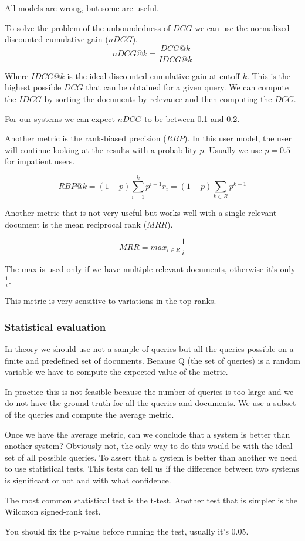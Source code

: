 All models are wrong, but some are useful.

To solve the problem of the unboundedness of $DCG$ we can use the normalized discounted
cumulative gain ($nDCG$).
\[
    nDCG@k = \frac{DCG@k}{IDCG@k}
\]

Where $IDCG@k$ is the ideal discounted cumulative gain at cutoff $k$. This is the
highest possible $DCG$ that can be obtained for a given query.
We can compute the $IDCG$ by sorting the documents by relevance and then computing the $DCG$.

For our systems we can expect $nDCG$ to be between 0.1 and 0.2.

Another metric is the rank-biased precision ($RBP$).
In this user model, the user will continue looking at the results with a probability $p$.
Usually we use $p=0.5$ for impatient users.

\[
    RBP@k = (1-p)\sum_{i=1}^kp^{i-1}r_i=(1-p)\sum_{k\in R}p^{k-1}
\]

Another metric that is not very useful but works well with a single relevant document is
the mean reciprocal rank ($MRR$).

\[
    MRR = max_{i\in R} \frac{1}{i}
\]

The max is used only if we have multiple relevant documents, otherwise it's only
$\frac{1}{i}$.

This metric is very sensitive to variations in the top ranks.

\subsubsection{Statistical evaluation}
\label{sec:statistical_evaluation}

In theory we should use not a sample of queries but all the queries possible
on a finite and predefined set of documents. Because Q (the set of queries) is
a random variable we have to compute the expected value of the metric.

In practice this is not feasible because the number of queries is too large
and we do not have the ground truth for all the queries and documents.
We use a subset of the queries and compute the average metric.

Once we have the average metric, can we conclude that a system is better than
another system?
Obviously not, the only way to do this would be with the ideal set of all 
possible queries.
To assert that a system is better than another we need to use statistical tests.
This tests can tell us if the difference between two systems is significant or not
and with what confidence.

The most common statistical test is the t-test.
Another test that is simpler is the Wilcoxon signed-rank test.

You should fix the p-value before running the test, usually it's 0.05.